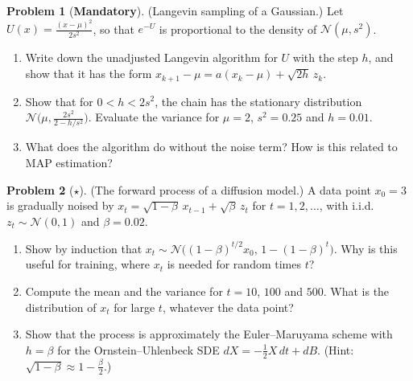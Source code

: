 \documentclass[11pt]{article}
\theoremstyle{definition}
\newtheorem{problem}{Problem}[section]
\newcommand{\mandatory}{\textcolor{red!70!black}{\textbf{Mandatory}}}
\begin{document}
\begin{problem}[\mandatory]\label{pr:ula}
    (Langevin sampling of a Gaussian.) Let $U(x) = \frac{(x - \mu)^2}{2s^2}$, so that $e^{-U}$ is proportional to the density of $\mathcal{N}(\mu, s^2)$.
    \begin{enumerate}[label=(\alph*)]
        \item Write down the unadjusted Langevin algorithm for $U$ with the step $h$, and show that it has the form $x_{k+1} - \mu = a(x_k - \mu) + \sqrt{2h}\,z_k$.
        \item Show that for $0 < h < 2s^2$, the chain has the stationary distribution $\mathcal{N}\big(\mu, \frac{2s^2}{2 - h/s^2}\big)$. Evaluate the variance for $\mu = 2$, $s^2 = 0.25$ and $h = 0.01$.
        \item What does the algorithm do without the noise term? How is this related to MAP estimation?
    \end{enumerate}
\end{problem}

\begin{problem}[$\star$]\label{pr:diffusion-forward}
    (The forward process of a diffusion model.) A data point $x_0 = 3$ is gradually noised by $x_t = \sqrt{1 - \beta}\,x_{t-1} + \sqrt{\beta}\,z_t$ for $t = 1, 2, \ldots$, with i.i.d.\ $z_t \sim \mathcal{N}(0, 1)$ and $\beta = 0.02$.
    \begin{enumerate}[label=(\alph*)]
        \item Show by induction that $x_t \sim \mathcal{N}\big((1 - \beta)^{t/2}x_0, \, 1 - (1 - \beta)^t\big)$. Why is this useful for training, where $x_t$ is needed for random times $t$?
        \item Compute the mean and the variance for $t = 10$, $100$ and $500$. What is the distribution of $x_t$ for large $t$, whatever the data point?
        \item Show that the process is approximately the Euler--Maruyama scheme with $h = \beta$ for the Ornstein--Uhlenbeck SDE $dX = -\frac{1}{2}X\,dt + dB$. (Hint: $\sqrt{1 - \beta} \approx 1 - \frac{\beta}{2}$.)
    \end{enumerate}
\end{problem}
\end{document}
